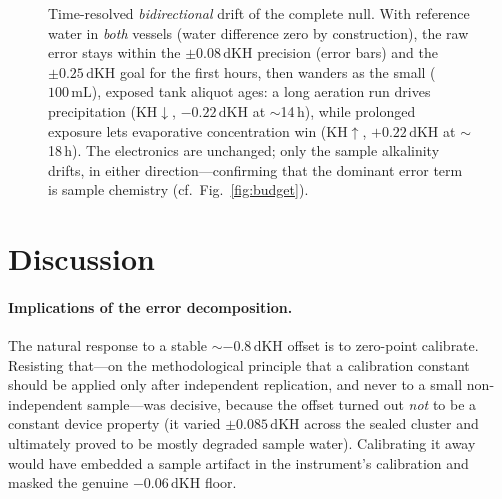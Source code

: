 \documentclass[11pt]{article}
\newcommand{\dkh}{\ensuremath{\,\mathrm{dKH}}}
\begin{document}
\begin{figure}[t]
\centering
{}
\caption{Time-resolved \emph{bidirectional} drift of the complete null. With
reference water in \emph{both} vessels (water difference zero by construction),
the raw error stays within the $\pm0.08\dkh$ precision (error bars) and the
$\pm0.25\dkh$ goal for the first hours, then wanders as the small
($100\,\mathrm{mL}$), exposed tank aliquot ages: a long aeration run drives
 precipitation (KH$\downarrow$, $-0.22\dkh$ at $\sim$14\,h), while
prolonged exposure lets evaporative concentration win (KH$\uparrow$, $+0.22\dkh$
at $\sim$18\,h). The electronics are unchanged; only the sample alkalinity
drifts, in either direction---confirming that the dominant error term is sample
chemistry (cf.\ Fig.~\ref{fig:budget}).}
\label{fig:degrade}
\end{figure}

\section{Discussion}
\paragraph{Implications of the error decomposition.} The natural response to a
stable $\sim-0.8\dkh$ offset is to zero-point calibrate. Resisting that---on the
methodological principle that a calibration constant should be applied only
after independent replication, and never to a small non-independent
sample---was decisive, because the offset turned out \emph{not} to be a
constant device property (it varied $\pm0.085\dkh$ across the sealed cluster and
ultimately proved to be mostly degraded sample water). Calibrating it away would
have embedded a sample artifact in the instrument's calibration and masked the
genuine $-0.06\dkh$ floor.
\end{document}
